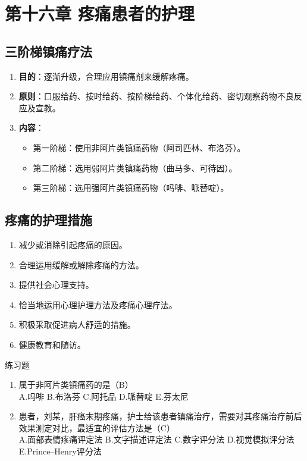 \documentclass[11pt, a4paper]{ctexart}
\begin{document}
\section{第十六章 疼痛患者的护理}
\subsection{三阶梯镇痛疗法}
\begin{enumerate}
    \item \textbf{目的}：逐渐升级，合理应用镇痛剂来缓解疼痛。
    \item \textbf{原则}：口服给药、按时给药、按阶梯给药、个体化给药、密切观察药物不良反应及宣教。
    \item \textbf{内容}：
    \begin{itemize}
        \item 第一阶梯：使用非阿片类镇痛药物（阿司匹林、布洛芬）。
        \item 第二阶梯：选用弱阿片类镇痛药物（曲马多、可待因）。
        \item 第三阶梯：选用强阿片类镇痛药物（吗啡、哌替啶）。
    \end{itemize}
\end{enumerate}

\subsection{疼痛的护理措施}
\begin{enumerate}
    \item 减少或消除引起疼痛的原因。
    \item 合理运用缓解或解除疼痛的方法。
    \item 提供社会心理支持。
    \item 恰当地运用心理护理方法及疼痛心理疗法。
    \item 积极采取促进病人舒适的措施。
    \item 健康教育和随访。
\end{enumerate}

\begin{examplebox}{练习题}
\begin{enumerate}
    \item 属于非阿片类镇痛药的是（B）\\
    A.吗啡 \quad B.布洛芬 \quad C.阿托品 \quad D.哌替啶 \quad E.芬太尼
    \item 患者，刘某，肝癌末期疼痛，护士给该患者镇痛治疗，需要对其疼痛治疗前后效果测定对比，最适宜的评估方法是（C）\\
    A.面部表情疼痛评定法 \quad B.文字描述评定法 \quad C.数字评分法 \quad D.视觉模拟评分法 \quad E.Prince–Henry评分法
\end{enumerate}
\end{examplebox}
\end{document}
